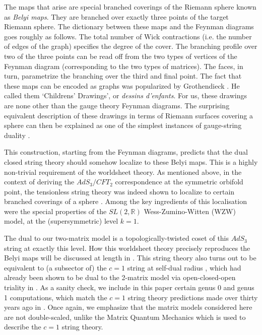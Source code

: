 \documentclass[english]{article}
\renewcommand{\>}{\rangle}
\newcommand{\<}{\langle}
\renewcommand{\(}{\left(}
\renewcommand{\)}{\right)}
\begin{document}
The maps that arise are special branched coverings of the Riemann sphere known as \textit{Belyi maps}\cite{zbMATH03668723,Lando2003GraphsOS}. They are branched over exactly three points of the target Riemann sphere. The dictionary between these maps and the Feynman diagrams goes roughly as follows. The total number of Wick contractions (i.e. the number of edges of the graph) specifies the degree of the cover. The branching profile over two of the three points can be read off from the two types of vertices of the Feynman diagram (corresponding to the two types of matrices). The faces, in turn, parametrize the branching over the third and final point. The fact that these maps can be encoded as graphs was popularized by Grothendieck \cite{grothendieck1984}. He called them `Childrens' Drawings', or \textit{dessins d'enfants}. For us, these drawings are none other than the gauge theory Feynman diagrams. The surprising equivalent description of these drawings in terms of Riemann surfaces covering a sphere can then be explained as one of the simplest instances of gauge-string duality \cite{deMelloKoch:2010hav}.

This construction, starting from the Feynman diagrams, predicts that the dual closed string theory should somehow localize to these Belyi maps. This is a highly non-trivial requirement of the worldsheet theory. As mentioned above, in the context of deriving the $AdS_3/CFT_2$ correspondence at the symmetric orbifold point, the tensionless string theory \cite{Gaberdiel:2018rqv} was indeed shown to localize to certain branched coverings of a sphere \cite{eberhardt2019worldsheet,eberhardt2020deriving, gaberdiel2021symmetric}. Among the key ingredients of this localisation were the special properties of the $SL(2,\mathbb{R})$ Wess-Zumino-Witten (WZW) model, at the  (supersymmetric) level $k=1$.

The dual to our two-matrix model is a topologically-twisted coset of this $AdS_3$ string at exactly this level. How this worldsheet theory precisely reproduces the Belyi maps will be discussed at length in \cite{DSDIII}. This string theory also turns out to be equivalent to (a subsector of) the $c=1$ string at self-dual radius \cite{MukhiVafa,ashok2006topological}, which had already been shown to be dual to the 2-matrix model via open-closed-open triality in \cite{DSDI}. As a sanity check, we include in this paper certain genus 0 and genus 1 computations, which match the $c=1$ string theory predictions made over thirty years ago in \cite{klebanov1991string}. Once again, we emphasize that the matrix models considered here are not double-scaled, unlike the Matrix Quantum Mechanics which is used to describe the $c=1$ string theory.\\ 
\end{document}
